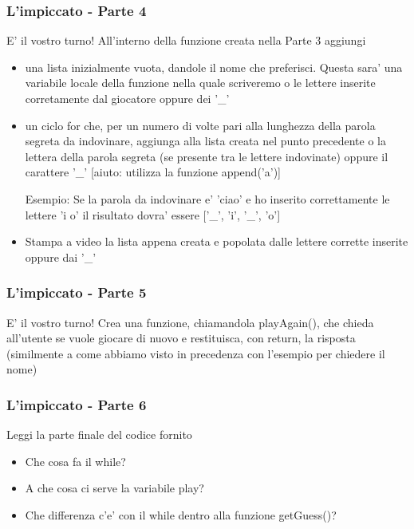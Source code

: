 \begin{frame}[fragile]
\frametitle{L'impiccato - Parte 4}

\begin{block}{E' il vostro turno!}
All'interno della funzione creata nella Parte 3 aggiungi
    \begin{itemize}
        \item una lista inizialmente vuota, dandole il nome che preferisci. Questa sara' una variabile locale della funzione nella quale scriveremo o le lettere inserite corretamente dal giocatore oppure dei '\_'
        \item un ciclo for che, per un numero di volte pari alla lunghezza della parola segreta da indovinare, aggiunga alla lista creata nel punto precedente o la lettera della parola segreta (se presente tra le lettere indovinate) oppure il carattere '\_' [aiuto: utilizza la funzione append('a')]
        
        Esempio: Se la parola da indovinare e' 'ciao' e ho inserito correttamente le lettere 'i o' il risultato dovra' essere ['\_', 'i', '\_', 'o']
        \item Stampa a video la lista appena creata e popolata dalle lettere corrette inserite oppure dai '\_'
    \end{itemize}
\end{block}
\end{frame}

\begin{frame}[fragile]
\frametitle{L'impiccato - Parte 5}

\begin{block}{E' il vostro turno!}
Crea una funzione, chiamandola playAgain(), che chieda all'utente se vuole giocare di nuovo e restituisca, con return, la risposta (similmente a come abbiamo visto in precedenza con l'esempio per chiedere il nome)
\end{block}
\end{frame}

\begin{frame}[fragile]
\frametitle{L'impiccato - Parte 6}

\begin{block}{Leggi la parte finale del codice fornito}
    \begin{itemize}
        \item Che cosa fa il while?
        \item A che cosa ci serve la variabile play?
        \item Che differenza c'e' con il while dentro alla funzione getGuess()?
    \end{itemize}
\end{block}
\end{frame}